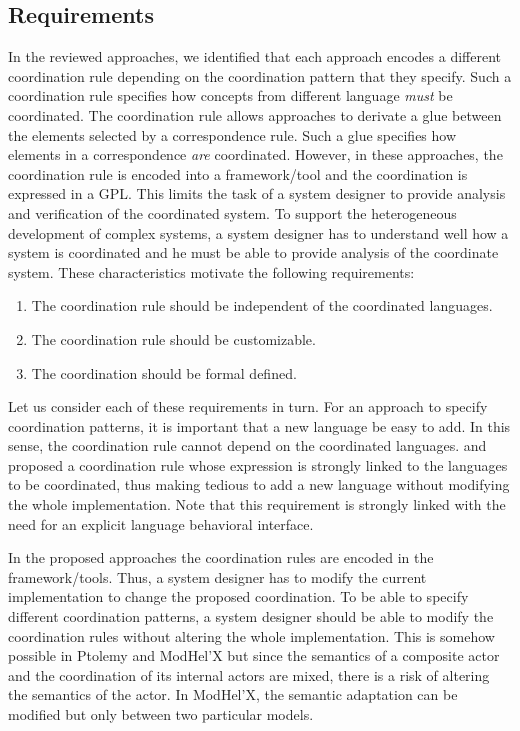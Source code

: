 \subsection{Requirements}
In the reviewed approaches, we identified that each approach encodes a different coordination rule depending on the coordination pattern that they specify. Such a coordination rule specifies how concepts from different language \emph{must} be coordinated. The coordination rule allows approaches to derivate a glue between the elements selected by a correspondence rule. Such a glue specifies how elements in a correspondence \emph{are} coordinated. However, in these approaches, the coordination rule is encoded into a framework/tool and the coordination is expressed in a GPL. This limits the task of a system designer to provide analysis and verification of the coordinated system. To support the heterogeneous development of complex systems, a system designer has to understand well how a system is coordinated and he must be able to provide analysis of the coordinate system. These characteristics motivate the following requirements:
	\begin{enumerate}
		\item The coordination rule should be independent of the coordinated languages. 
		\item The coordination rule should be customizable. 
		\item The coordination should be formal defined. 
	\end{enumerate}
	
Let us consider each of these requirements in turn. For an approach to specify coordination patterns, it is important that a new language be easy to add. In this sense, the coordination rule cannot depend on the coordinated languages. \cite{dinatale} and~\cite{mascotbib} proposed a coordination rule whose expression is strongly linked to the languages to be coordinated, thus making tedious to add a new language without modifying the whole implementation. Note that this requirement is strongly linked with the need for an explicit language behavioral interface.
	
In the proposed approaches the coordination rules are encoded in the framework/tools. Thus, a system designer has to modify the current implementation to change the proposed coordination. To be able to specify different coordination patterns, a system designer should be able to modify the coordination rules without altering the whole implementation. This is somehow possible in Ptolemy and ModHel'X but since the semantics of a composite actor and the coordination of its internal actors are mixed, there is a risk of altering the semantics of the actor. In ModHel'X, the semantic adaptation can be modified but only between two particular models.
	
